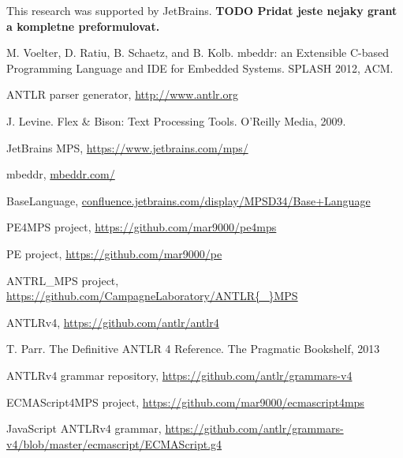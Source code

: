 \documentclass[10pt]{sigplanconf}
\newcommand{\todo}[1]{{\bfseries TODO #1}}
\begin{document}
\acks
This research was supported by JetBrains. \todo{Pridat jeste nejaky grant a kompletne preformulovat.}



\begin{thebibliography}{}

 M. Voelter, D. Ratiu, B. Schaetz, and B. Kolb. mbeddr: an Extensible C-based Programming Language and IDE for Embedded Systems. SPLASH 2012, ACM.

 ANTLR parser generator, \url{http://www.antlr.org}

 J. Levine. Flex \& Bison: Text Processing Tools. O'Reilly Media, 2009.

 JetBrains MPS, \url{https://www.jetbrains.com/mps/}



 mbeddr, \url{mbeddr.com/}

 BaseLanguage, \url{confluence.jetbrains.com/display/MPSD34/Base+Language}

 PE4MPS project, \url{https://github.com/mar9000/pe4mps}

 PE project, \url{https://github.com/mar9000/pe}

 ANTRL{\_}MPS project, \url{https://github.com/CampagneLaboratory/ANTLR{\_}MPS}

 ANTLRv4, \url{https://github.com/antlr/antlr4}

 T. Parr. The Definitive ANTLR 4 Reference. The Pragmatic Bookshelf, 2013

 ANTLRv4 grammar repository, \url{https://github.com/antlr/grammars-v4}

 ECMAScript4MPS project, \url{https://github.com/mar9000/ecmascript4mps}

 JavaScript ANTLRv4 grammar, \url{https://github.com/antlr/grammars-v4/blob/master/ecmascript/ECMAScript.g4}

\end{thebibliography}
\end{document}

